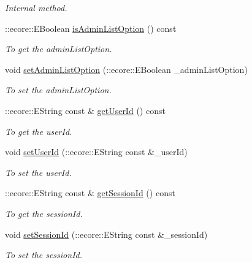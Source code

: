 \begin{DoxyCompactItemize}
\begin{DoxyCompactList}\small\item\em Internal method. \item\end{DoxyCompactList}\item 
::ecore::EBoolean \hyperlink{classUMS__Data_1_1ListCmdOptions_a409458db920c4e8062e53c7b701aa3d2}{isAdminListOption} () const 
\begin{DoxyCompactList}\small\item\em To get the adminListOption. \item\end{DoxyCompactList}\item 
void \hyperlink{classUMS__Data_1_1ListCmdOptions_acbf0ea50fd24b35dc727bddc4228392b}{setAdminListOption} (::ecore::EBoolean \_\-adminListOption)
\begin{DoxyCompactList}\small\item\em To set the adminListOption. \item\end{DoxyCompactList}\item 
::ecore::EString const \& \hyperlink{classUMS__Data_1_1ListCmdOptions_ab6f5e4c1c9a72738a93ceaeb50c58c13}{getUserId} () const 
\begin{DoxyCompactList}\small\item\em To get the userId. \item\end{DoxyCompactList}\item 
void \hyperlink{classUMS__Data_1_1ListCmdOptions_aaa0dc1213a8073b78f22c2ecfb4d06c6}{setUserId} (::ecore::EString const \&\_\-userId)
\begin{DoxyCompactList}\small\item\em To set the userId. \item\end{DoxyCompactList}\item 
::ecore::EString const \& \hyperlink{classUMS__Data_1_1ListCmdOptions_a5270db8868d9d29c9ce793b764ab0cda}{getSessionId} () const 
\begin{DoxyCompactList}\small\item\em To get the sessionId. \item\end{DoxyCompactList}\item 
void \hyperlink{classUMS__Data_1_1ListCmdOptions_ab7b5170842943e0a6805e956d6d96cfd}{setSessionId} (::ecore::EString const \&\_\-sessionId)
\begin{DoxyCompactList}\small\item\em To set the sessionId. \item\end{DoxyCompactList}\item 

\end{DoxyCompactItemize}
